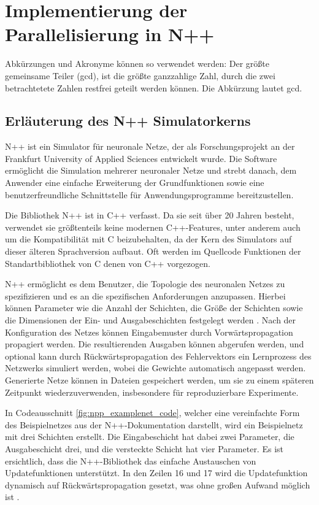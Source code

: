 \chapter{Implementierung der Parallelisierung in N++}
\label{ch:Implementierung_Parallelisierung_Npp}

Abkürzungen und Akronyme können so verwendet werden: Der größte gemeinsame Teiler (\acrlong{gcd}), ist die größte ganzzahlige Zahl, durch die
zwei betrachtetete Zahlen restfrei geteilt werden können.
Die Abkürzung lautet \acrshort{gcd}.

\section{Erläuterung des N++ Simulatorkerns}
\label{sec:Erlauterung_Npp}
N++ ist ein Simulator für neuronale Netze, der als Forschungsprojekt an der Frankfurt University of Applied Sciences entwickelt wurde. Die Software ermöglicht die Simulation mehrerer neuronaler Netze und strebt danach, dem Anwender eine einfache Erweiterung der Grundfunktionen sowie eine benutzerfreundliche Schnittstelle für Anwendungsprogramme bereitzustellen.

Die Bibliothek N++ ist in C++ verfasst. Da sie seit über 20 Jahren besteht, verwendet sie größtenteils keine modernen C++-Features, unter anderem auch um die Kompatibilität mit C beizubehalten, da der Kern des Simulators auf dieser älteren Sprachversion aufbaut. Oft werden im Quellcode Funktionen der Standartbibliothek von C denen von C++ vorgezogen.

N++ ermöglicht es dem Benutzer, die Topologie des neuronalen Netzes zu spezifizieren und es an die spezifischen Anforderungen anzupassen. Hierbei können Parameter wie die Anzahl der Schichten, die Größe der Schichten sowie die Dimensionen der Ein- und Ausgabeschichten festgelegt werden \citep{dokumentation_n++}. Nach der Konfiguration des Netzes können Eingabemuster durch Vorwärtspropagation propagiert werden. Die resultierenden Ausgaben können abgerufen werden, und optional kann durch Rückwärtspropagation des Fehlervektors ein Lernprozess des Netzwerks simuliert werden, wobei die Gewichte automatisch angepasst werden. Generierte Netze können in Dateien gespeichert werden, um sie zu einem späteren Zeitpunkt wiederzuverwenden, insbesondere für reproduzierbare Experimente.

In Codeausschnitt \ref{fig:npp_examplenet_code}, welcher eine vereinfachte Form des Beispielnetzes aus der N++-Dokumentation darstellt, wird ein Beispielnetz mit drei Schichten erstellt. Die Eingabeschicht hat dabei zwei Parameter, die Ausgabeschicht drei, und die versteckte Schicht hat vier Parameter. Es ist ersichtlich, dass die N++-Bibliothek das einfache Austauschen von Updatefunktionen unterstützt. In den Zeilen 16 und 17 wird die Updatefunktion dynamisch auf Rückwärtspropagation gesetzt, was ohne großen Aufwand möglich ist \citep{dokumentation_n++}.

